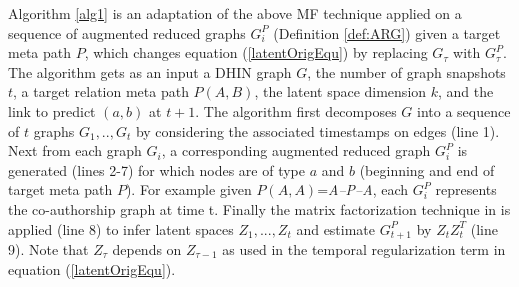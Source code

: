 Algorithm \ref{alg1} is an adaptation of the above MF technique applied on a sequence of augmented reduced graphs $G^P_i$ (Definition \ref{def:ARG}) given a target meta path $P$, which changes equation (\ref{latentOrigEqu}) by replacing $G_\tau$ with $G^{P}_\tau$.
The algorithm gets as an input a DHIN graph $G$, the number of graph snapshots $t$, a target relation meta path $P(A,B)$, the latent space dimension $k$, and the link to predict $(a,b)$ at $t+1$. The algorithm first decomposes $G$ into a sequence of $t$ graphs $G_1, .., G_t$ by considering the associated timestamps on edges (line 1). Next from each graph $G_i$, a corresponding augmented reduced graph $G^P_i$ is generated (lines 2-7) for which nodes are of type $a$ and $b$ (beginning and end of target  meta path $P$). For example given $P(A,A)$=\textit{A--P--A}, each $G^P_i$ represents the co-authorship graph at time t. Finally the matrix factorization technique in \cite{Zhu2016} is applied (line 8) to infer latent spaces $Z_1, ...,Z_t$ and estimate $G^P_{t+1}$ by $Z_tZ_t^T$ (line 9). Note that $Z_\tau$ depends on $Z_{\tau-1}$ as used in the temporal regularization term in equation (\ref{latentOrigEqu}).



